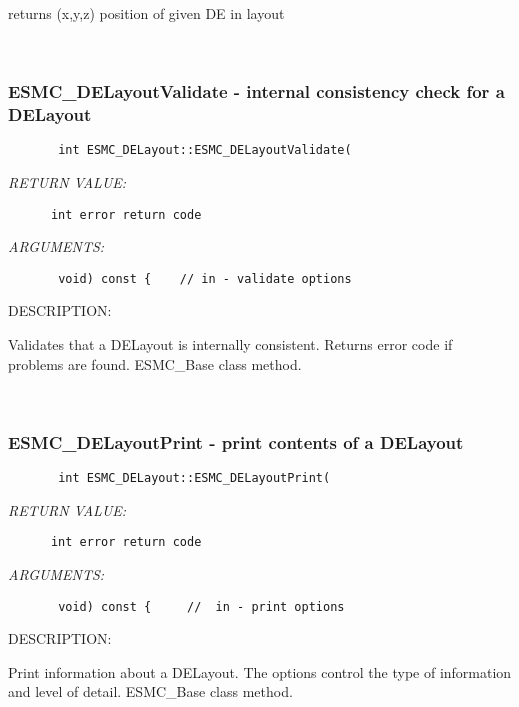       returns (x,y,z) position of given DE in layout
   
 
\mbox{}\hrulefill\ 
 
\subsubsection{ESMC\_DELayoutValidate - internal consistency check for a DELayout}


  
\begin{verbatim}       int ESMC_DELayout::ESMC_DELayoutValidate(\end{verbatim}{\em RETURN VALUE:}
\begin{verbatim}      int error return code\end{verbatim}{\em ARGUMENTS:}
\begin{verbatim}       void) const {    // in - validate options\end{verbatim}
{\sf DESCRIPTION:\\ }


        Validates that a DELayout is internally consistent.
        Returns error code if problems are found.  ESMC\_Base class method.
   
 
\mbox{}\hrulefill\ 
 
\subsubsection{ESMC\_DELayoutPrint - print contents of a DELayout}


  
\begin{verbatim}       int ESMC_DELayout::ESMC_DELayoutPrint(\end{verbatim}{\em RETURN VALUE:}
\begin{verbatim}      int error return code\end{verbatim}{\em ARGUMENTS:}
\begin{verbatim}       void) const {     //  in - print options\end{verbatim}
{\sf DESCRIPTION:\\ }


        Print information about a DELayout.  The options control the
        type of information and level of detail.  ESMC\_Base class method.
   
